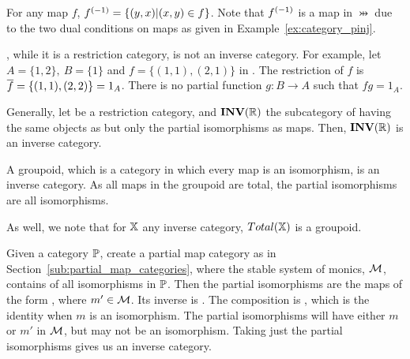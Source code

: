 \begin{example}\label{ex:pinj_is_an_inverse_category}
  For any map $f$, ${f}^{(-1)} = \{(y,x) | (x,y) \in
  f\}$. Note that ${f}^{(-1)}$ is a map in $\pinj$ due to the two dual conditions on maps as given in
  Example~\ref{ex:category_pinj}.
\end{example}
\begin{example}\label{ex:par_is_not_an_inverse_category}
  \Par, while it is a restriction category, is not an inverse category. For example, let
  $A=\{1,2\},\ B=\{1\}$ and $f=\{(1,1),(2,1)\}$ in \Par. The restriction of $f$ is $\overline{f} =
  \{(1,1),(2,2)\} = 1_A$. There is no partial function $g:B\to A$ such that $f g = 1_A$.
\end{example}
\begin{example}\label{ex:partial_isos_are_inverse_category}
  Generally, let \R be a restriction category, and $\mathbf{INV}({\mathbb{R}})$ the subcategory of \R having the same objects
  as \R but only the partial isomorphisms as maps. Then, $\mathbf{INV}({\mathbb{R}})$ is an inverse category.
\end{example}
\begin{example}\label{ex:groupoid_is_inverse_category}
  A groupoid, which is a category in which every map is an isomorphism, is an inverse category. As
  all maps in the groupoid are total, the partial isomorphisms are all  isomorphisms.

  As well, we note that for $\mathbb{X}$ any inverse category, $Total(\mathbb{X})$ is a groupoid.
\end{example}
\begin{example}\label{ex:partial_map_monics_is_inverse_category}
  Given a category $\mathbb{P}$, create a partial map category as in
  Section~\ref{sub:partial_map_categories}, where the stable system of monics, $\mathcal{M}$, contains of
  all  isomorphisms in $\mathbb{P}$. Then the partial isomorphisms are the maps of the form
  , where $m'\in\mathcal{M}$. Its inverse is
  . The composition is
   , which is the
  identity when $m$ is an isomorphism. The partial isomorphisms will have either $m$ or $m'$ in
  $\mathcal{M}$, but may not be an isomorphism. Taking just the partial isomorphisms gives us an inverse
  category.
\end{example}

